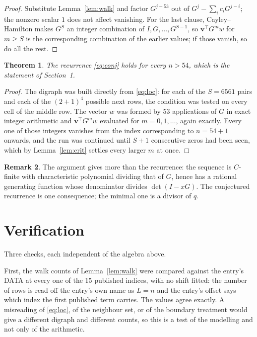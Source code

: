 \documentclass[11pt,a4paper]{article}
\theoremstyle{plain}
\newtheorem{theorem}{Theorem}
\theoremstyle{definition}
\newtheorem{remark}[theorem]{Remark}
\begin{document}
\begin{proof}
Substitute Lemma~\ref{lem:walk} and factor $G^{j-53}$ out of
$G^{j}-\sum_ic_iG^{j-i}$; the nonzero scalar $1$ does not affect
vanishing. For the last clause, Cayley--Hamilton makes $G^{S}$ an integer combination of
$I,G,\dots,G^{S-1}$, so $\mathbf{v}^{\!\top}G^{m}w$ for $m\ge S$ is the corresponding
combination of the earlier values; if those vanish, so do all the rest.
\end{proof}

\begin{theorem}
The recurrence \eqref{eq:conj} holds for every $n>54$, which is the statement of
Section~1.
\end{theorem}

\begin{proof}
The digraph was built directly from \eqref{eq:loc}: for each of the $S=6561$ pairs and each
of the $(2+1)^{4}$ possible next rows, the condition was tested on every cell of
the middle row. The vector $w$ was formed by $53$ applications of $G$ in exact integer
arithmetic and $\mathbf{v}^{\!\top}G^{m}w$ evaluated for $m=0,1,\dots$, again exactly.
Every one of those integers vanishes from the index corresponding to $n=54+1$ onwards,
and the run was continued until $S+1$ consecutive zeros had been seen, which by
Lemma~\ref{lem:crit} settles every larger $m$ at once.
\end{proof}

\begin{remark}
The argument gives more than the recurrence: the sequence is $C$-finite with characteristic
polynomial dividing that of $G$, hence has a rational generating function whose denominator
divides $\det(I-xG)$. The conjectured recurrence is one consequence; the minimal one is a
divisor of $q$.
\end{remark}

\section{Verification}

Three checks, each independent of the algebra above.

First, the walk counts of Lemma~\ref{lem:walk} were compared against the entry's DATA at
every one of the $15$ published indices, with no shift fitted: the number of rows is
read off the entry's own name as $L=n$ and the entry's offset says which index the first
published term carries. The values agree exactly. A misreading of \eqref{eq:loc}, of the
neighbour set, or of the boundary treatment would give a different digraph and different
counts, so this is a test of the modelling and not only of the arithmetic.
\end{document}
